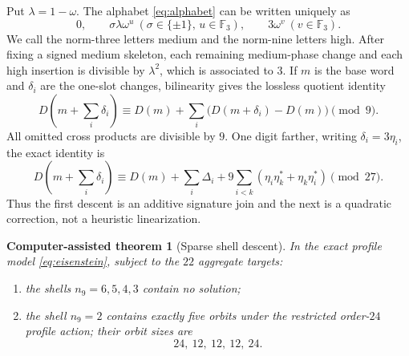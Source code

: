 \documentclass[11pt]{article}
\newtheorem{computationaltheorem}[theorem]{Computer-assisted theorem}
\theoremstyle{remark}
\newcommand{\F}{\mathbb F}
\begin{document}
Put $\lambda=1-\omega$.  The alphabet \eqref{eq:alphabet} can be written
uniquely as
\[
 0,\qquad \sigma\lambda\omega^u\ (\sigma\in\{\pm1\},\,u\in\F_3),
 \qquad 3\omega^v\ (v\in\F_3).
\]
We call the norm-three letters medium and the norm-nine letters high.
After fixing a signed medium skeleton, each remaining medium-phase change
and each high insertion is divisible by $\lambda^2$, which is associated
to $3$.  If $m$ is the base word and $\delta_i$ are the one-slot changes,
bilinearity gives the lossless quotient identity
\begin{equation}
 D\!\left(m+\sum_i\delta_i\right)
 \equiv D(m)+\sum_i\bigl(D(m+\delta_i)-D(m)\bigr)
 \pmod9.
 \label{eq:mod9-linear}
\end{equation}
All omitted cross products are divisible by $9$.  One digit farther,
writing $\delta_i=3\eta_i$, the exact identity is
\begin{equation}
 D\!\left(m+\sum_i\delta_i\right)
 \equiv D(m)+\sum_i\Delta_i+
 9\sum_{i<k}\left(\eta_i\eta_k^*+\eta_k\eta_i^*\right)
 \pmod {27}.
 \label{eq:mod27-quadratic}
\end{equation}
Thus the first descent is an additive signature join and the next is a
quadratic correction, not a heuristic linearization.

\begin{computationaltheorem}[Sparse shell descent]
\label{thm:sparse-shells}
In the exact profile model \eqref{eq:eisenstein}, subject to the $22$
aggregate targets:
\begin{enumerate}
\item the shells $n_9=6,5,4,3$ contain no solution;
\item the shell $n_9=2$ contains exactly five orbits under the restricted
order-$24$ profile action; their orbit sizes are
\[
 24,\ 12,\ 12,\ 12,\ 24.
\]
\end{enumerate}
\end{computationaltheorem}
\end{document}
